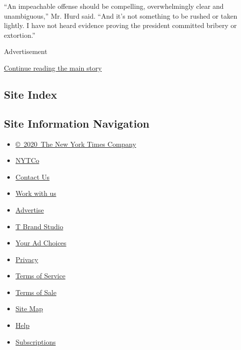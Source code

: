 ``An impeachable offense should be compelling, overwhelmingly clear and
unambiguous,'' Mr. Hurd said. ``And it's not something to be rushed or
taken lightly. I have not heard evidence proving the president committed
bribery or extortion.''

Advertisement

\protect\hyperlink{after-bottom}{Continue reading the main story}

\hypertarget{site-index}{%
\subsection{Site Index}\label{site-index}}

\hypertarget{site-information-navigation}{%
\subsection{Site Information
Navigation}\label{site-information-navigation}}

\begin{itemize}
\tightlist
\item
  \href{https://help.nytimes3xbfgragh.onion/hc/en-us/articles/115014792127-Copyright-notice}{©~2020~The
  New York Times Company}
\end{itemize}

\begin{itemize}
\tightlist
\item
  \href{https://www.nytco.com/}{NYTCo}
\item
  \href{https://help.nytimes3xbfgragh.onion/hc/en-us/articles/115015385887-Contact-Us}{Contact
  Us}
\item
  \href{https://www.nytco.com/careers/}{Work with us}
\item
  \href{https://nytmediakit.com/}{Advertise}
\item
  \href{http://www.tbrandstudio.com/}{T Brand Studio}
\item
  \href{https://www.nytimes3xbfgragh.onion/privacy/cookie-policy\#how-do-i-manage-trackers}{Your
  Ad Choices}
\item
  \href{https://www.nytimes3xbfgragh.onion/privacy}{Privacy}
\item
  \href{https://help.nytimes3xbfgragh.onion/hc/en-us/articles/115014893428-Terms-of-service}{Terms
  of Service}
\item
  \href{https://help.nytimes3xbfgragh.onion/hc/en-us/articles/115014893968-Terms-of-sale}{Terms
  of Sale}
\item
  \href{https://spiderbites.nytimes3xbfgragh.onion}{Site Map}
\item
  \href{https://help.nytimes3xbfgragh.onion/hc/en-us}{Help}
\item
  \href{https://www.nytimes3xbfgragh.onion/subscription?campaignId=37WXW}{Subscriptions}
\end{itemize}
